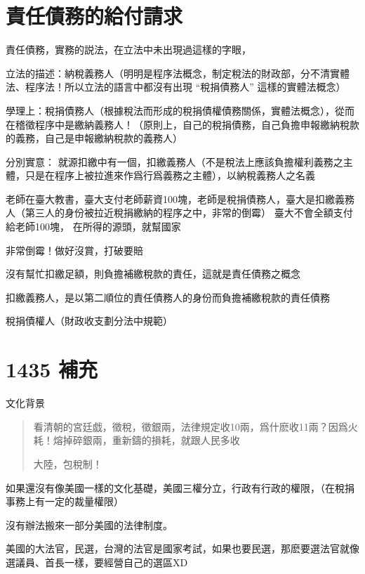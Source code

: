 \documentclass[]{ctexbook}
\begin{document}
\hypertarget{ux8cacux4efbux50b5ux52d9ux7684ux7d66ux4ed8ux8acbux6c42}{%
\section{責任債務的給付請求}\label{ux8cacux4efbux50b5ux52d9ux7684ux7d66ux4ed8ux8acbux6c42}}

責任債務，實務的説法，在立法中未出現過這樣的字眼，

立法的描述：納稅義務人（明明是程序法概念，制定稅法的財政部，分不清實體法、程序法！所以立法的語言中都沒有出現 ``稅捐債務人'' 這樣的實體法概念）

學理上：稅捐債務人（根據稅法而形成的稅捐債權債務關係，實體法概念），從而在稽徵程序中是繳納義務人！（原則上，自己的稅捐債務，自己負擔申報繳納稅款的義務，自己是申報繳納稅款的義務人）

分別實意：
就源扣繳中有一個，扣繳義務人（不是稅法上應該負擔權利義務之主體，只是在程序上被拉進來作爲行爲義務之主體），以納稅義務人之名義

老師在臺大教書，臺大支付老師薪資100塊，老師是稅捐債務人，臺大是扣繳義務人（第三人的身份被拉近稅捐繳納的程序之中，非常的倒霉）
臺大不會全額支付給老師100塊，
在所得的源頭，就幫國家

非常倒霉！做好沒賞，打破要賠

沒有幫忙扣繳足額，則負擔補繳稅款的責任，這就是責任債務之概念

扣繳義務人，是以第二順位的責任債務人的身份而負擔補繳稅款的責任債務

稅捐債權人（財政收支劃分法中規範）

\hypertarget{ux88dcux5145}{%
\section{1435 補充}\label{ux88dcux5145}}

文化背景

\begin{quote}
看清朝的宮廷戯，徵稅，徵銀兩，法律規定收10兩，爲什麽收11兩？因爲火耗！熔掉碎銀兩，重新鑄的損耗，就跟人民多收

大陸，包稅制！
\end{quote}

如果還沒有像美國一樣的文化基礎，美國三權分立，行政有行政的權限，（在稅捐事務上有一定的裁量權限）

沒有辦法搬來一部分美國的法律制度。

美國的大法官，民選，台灣的法官是國家考試，如果也要民選，那麽要選法官就像選議員、首長一樣，要經營自己的選區XD
\end{document}
